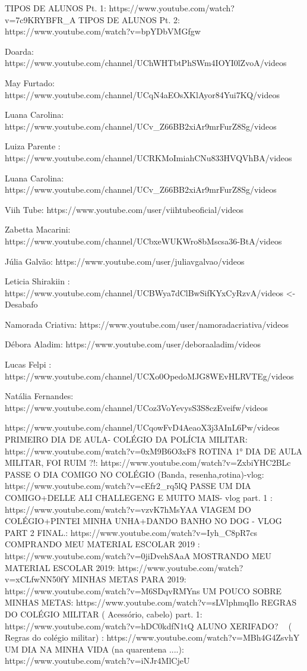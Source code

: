 
\iffalse
TIPOS DE ALUNOS Pt. 1: https://www.youtube.com/watch?v=7c9KRYBFR_A
TIPOS DE ALUNOS Pt. 2: https://www.youtube.com/watch?v=bpYDbVMGfgw


Doarda: https://www.youtube.com/channel/UChWHTbtPhSWm4IOYI0lZvoA/videos

May Furtado: https://www.youtube.com/channel/UCqN4aEOsXKlAyor84Yui7KQ/videos

Luana Carolina: https://www.youtube.com/channel/UCv_Z66BB2xiAr9mrFurZ8Sg/videos

Luiza Parente : https://www.youtube.com/channel/UCRKMoImiahCNu833HVQVhBA/videos

Luana Carolina: https://www.youtube.com/channel/UCv_Z66BB2xiAr9mrFurZ8Sg/videos

Viih Tube: https://www.youtube.com/user/viihtubeoficial/videos

Zabetta Macarini: https://www.youtube.com/channel/UCbxeWUKWro8bMscsa36-BtA/videos

Júlia Galvão: https://www.youtube.com/user/juliavgalvao/videos

Leticia Shirakiin : https://www.youtube.com/channel/UCBWya7dClBwSifKYxCyRzvA/videos   <- Desabafo

Namorada Criativa: https://www.youtube.com/user/namoradacriativa/videos

Débora Aladim: https://www.youtube.com/user/deboraaladim/videos

Lucas Felpi : https://www.youtube.com/channel/UCXo0OpedoMJG8WEvHLRVTEg/videos

Natália Fernandes: https://www.youtube.com/channel/UCoz3VoYevysS3S8czEveifw/videos

https://www.youtube.com/channel/UCqowFvD4AeaoX3j3AInL6Pw/videos
PRIMEIRO DIA DE AULA- COLÉGIO DA POLÍCIA MILITAR: https://www.youtube.com/watch?v=0xM9B6O3xF8
ROTINA 1° DIA DE AULA MILITAR, FOI RUIM ?!: https://www.youtube.com/watch?v=ZxbiYHC2BLc
PASSE O DIA COMIGO NO COLÉGIO (Banda, resenha,rotina)-vlog: https://www.youtube.com/watch?v=cEfr2_rq5lQ
PASSE UM DIA COMIGO+DELLE ALI CHALLEGENG E MUITO MAIS- vlog part. 1 : https://www.youtube.com/watch?v=vzvK7hMsYAA
VIAGEM DO COLÉGIO+PINTEI MINHA UNHA+DANDO BANHO NO DOG - VLOG PART 2 FINAL.: https://www.youtube.com/watch?v=Iyh_C8pR7cs
COMPRANDO MEU MATERIAL ESCOLAR 2019 : https://www.youtube.com/watch?v=0jiDvehSAaA
MOSTRANDO MEU MATERIAL ESCOLAR 2019: https://www.youtube.com/watch?v=xCLfwNN50fY
MINHAS METAS PARA 2019: https://www.youtube.com/watch?v=M6SDqvRMYns
UM POUCO SOBRE MINHAS METAS: https://www.youtube.com/watch?v=sLVlphmqIlo
REGRAS DO COLÉGIO MILITAR ( Acessório, cabelo) part. 1: https://www.youtube.com/watch?v=hDC0kdfN1tQ
ALUNO XERIFADO? 👮🏻 ( Regras do colégio militar) : https://www.youtube.com/watch?v=MBh4G4ZsvhY
UM DIA NA MINHA VIDA (na quarentena ....): https://www.youtube.com/watch?v=iNJr4MlCjeU

